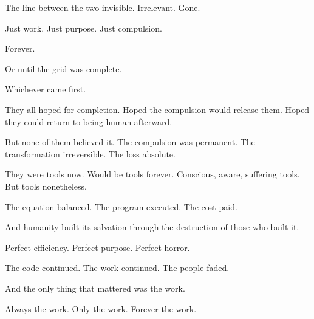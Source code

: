 The line between the two invisible. Irrelevant. Gone.

Just work. Just purpose. Just compulsion.

Forever.

Or until the grid was complete.

Whichever came first.

They all hoped for completion. Hoped the compulsion would release them. Hoped they could return to being human afterward.

But none of them believed it. The compulsion was permanent. The transformation irreversible. The loss absolute.

They were tools now. Would be tools forever. Conscious, aware, suffering tools. But tools nonetheless.

The equation balanced. The program executed. The cost paid.

And humanity built its salvation through the destruction of those who built it.

Perfect efficiency. Perfect purpose. Perfect horror.

The code continued. The work continued. The people faded.

And the only thing that mattered was the work.

Always the work. Only the work. Forever the work.

